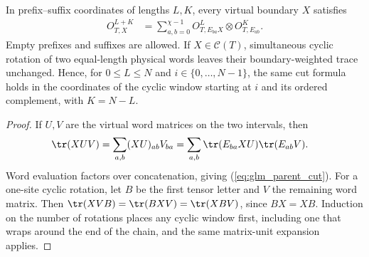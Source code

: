 \begin{lemma}
    \label{thm:glm_boundary_cut}
    \leanok
    In prefix--suffix coordinates of lengths $L,K$, every virtual boundary $X$
    satisfies
    \begin{align}
        O^{L+K}_{T,X}
         & =\sum_{a,b=0}^{\chi-1}O^L_{T,E_{ba}X}\otimes O^K_{T,E_{ab}}.
        \label{eq:glm_parent_cut}
    \end{align}
    Empty prefixes and suffixes are allowed. If $X\in\mathcal C(T)$,
    simultaneous cyclic rotation of two equal-length physical words leaves
    their boundary-weighted trace unchanged. Hence, for $0\leq L\leq N$
    and $i\in\{0,\ldots,N-1\}$, the same cut formula holds in the coordinates
    of the cyclic window starting at $i$ and its ordered complement,
    with $K=N-L$.
\end{lemma}
\begin{proof}
    \leanok
    If $U,V$ are the virtual word matrices on the two intervals, then
    \begin{align}
        \tr(XUV)
         & =\sum_{a,b}(XU)_{ab}V_{ba}
        =\sum_{a,b}\tr(E_{ba}XU)\tr(E_{ab}V).
        \label{eq:glm_parent_trace_cut}
    \end{align}
    Word evaluation factors over concatenation, giving
    (\ref{eq:glm_parent_cut}). For a one-site cyclic rotation, let
    $B$ be the first tensor letter and $V$ the remaining word matrix.
    Then $\tr(XVB)=\tr(BXV)=\tr(XBV)$, since $BX=XB$.
    Induction on the number of rotations places any cyclic window first,
    including one that wraps around the end of the chain, and the same
    matrix-unit expansion applies.
\end{proof}

